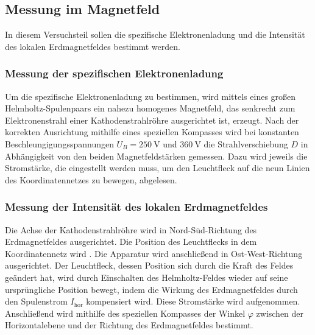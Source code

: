 \subsection{Messung im Magnetfeld}
In diesem Versuchsteil sollen die spezifische Elektronenladung
und die Intensität des lokalen Erdmagnetfeldes bestimmt werden.

\subsubsection{Messung der spezifischen Elektronenladung}
Um die spezifische Elektronenladung zu bestimmen, wird mittels 
eines großen Helmholtz-Spulenpaars ein nahezu homogenes 
Magnetfeld, das senkrecht zum Elektronenstrahl einer 
Kathodenstrahlröhre ausgerichtet ist, erzeugt.
Nach der korrekten Ausrichtung mithilfe eines speziellen
Kompasses wird bei konstanten
Beschleungigungsspannungen $U_B = \SI{250}{\volt}$ und 
$\SI{360}{\volt}$ die Strahlverschiebung $D$ in Abhängigkeit 
von den beiden Magnetfeldstärken gemessen. Dazu wird jeweils die
Stromstärke, die eingestellt werden muss, um den Leuchtfleck
auf die neun Linien des Koordinatennetzes zu bewegen,
abgelesen.

\subsubsection{Messung der Intensität des lokalen Erdmagnetfeldes}
Die Achse der Kathodenstrahlröhre wird in Nord-Süd-Richtung
des Erdmagnetfeldes ausgerichtet. Die Position des Leuchtflecks 
in dem Koordinatennetz wird %
.
Die Apparatur wird anschließend in Ost-West-Richtung ausgerichtet.
Der Leuchtfleck, dessen Position sich durch die Kraft des
Feldes geändert hat, wird durch Einschalten des Helmholtz-Feldes
wieder auf seine ursprüngliche Position bewegt, indem die Wirkung
des Erdmagnetfeldes durch den Spulenstrom $I_\text{hor}$ kompensiert
wird. Diese Stromstärke wird aufgenommen.
Anschließend wird mithilfe des speziellen Kompasses der Winkel
$\varphi$ zwischen der Horizontalebene und der Richtung des
Erdmagnetfeldes bestimmt.